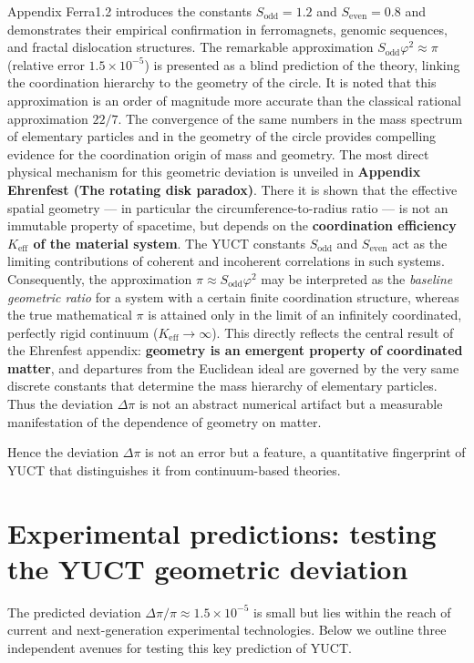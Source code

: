 \documentclass[11pt,a4paper]{article}
\begin{document}
	Appendix Ferra1.2 introduces the constants \(S_{\mathrm{odd}}=1.2\) and \(S_{\mathrm{even}}=0.8\) and demonstrates their empirical confirmation in ferromagnets, genomic sequences, and fractal dislocation structures. The remarkable approximation \(S_{\mathrm{odd}}\varphi^2 \approx \pi\) (relative error \(1.5\times10^{-5}\)) is presented as a blind prediction of the theory, linking the coordination hierarchy to the geometry of the circle. It is noted that this approximation is an order of magnitude more accurate than the classical rational approximation \(22/7\). The convergence of the same numbers in the mass spectrum of elementary particles and in the geometry of the circle provides compelling evidence for the coordination origin of mass and geometry. The most direct physical mechanism for this geometric deviation is unveiled in \textbf{Appendix Ehrenfest (The rotating disk paradox)}. There it is shown that the effective spatial geometry — in particular the circumference-to-radius ratio — is not an immutable property of spacetime, but depends on the \textbf{coordination efficiency \(K_{\mathrm{eff}}\) of the material system}. The YUCT constants \(S_{\mathrm{odd}}\) and \(S_{\mathrm{even}}\) act as the limiting contributions of coherent and incoherent correlations in such systems. Consequently, the approximation \(\pi \approx S_{\mathrm{odd}}\varphi^2\) may be interpreted as the \textit{baseline geometric ratio} for a system with a certain finite coordination structure, whereas the true mathematical \(\pi\) is attained only in the limit of an infinitely coordinated, perfectly rigid continuum (\(K_{\mathrm{eff}} \to \infty\)). This directly reflects the central result of the Ehrenfest appendix: \textbf{geometry is an emergent property of coordinated matter}, and departures from the Euclidean ideal are governed by the very same discrete constants that determine the mass hierarchy of elementary particles. Thus the deviation \(\Delta\pi\) is not an abstract numerical artifact but a measurable manifestation of the dependence of geometry on matter.
	
	Hence the deviation \(\Delta\pi\) is not an error but a feature, a quantitative fingerprint of YUCT that distinguishes it from continuum-based theories.
	
	\section{Experimental predictions: testing the YUCT geometric deviation}
	
	The predicted deviation \(\Delta\pi/\pi \approx 1.5\times10^{-5}\) is small but lies within the reach of current and next-generation experimental technologies. Below we outline three independent avenues for testing this key prediction of YUCT.
	
\end{document}
